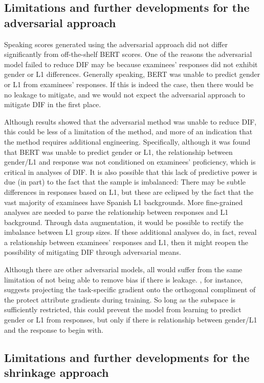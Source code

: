 \documentclass [PhD] {uclathes}
\begin{document}
\subsection{Limitations and further developments for the adversarial approach}

Speaking scores generated using the adversarial approach did not differ significantly from off-the-shelf BERT scores. One of the reasons the adversarial model failed to reduce DIF may be because examinees’ responses did not exhibit gender or L1 differences. Generally speaking, BERT was unable to predict gender or L1 from examinees’ responses. If this is indeed the case, then there would be no leakage to mitigate, and we would not expect the adversarial approach to mitigate DIF in the first place. 

Although results showed that the adversarial method was unable to reduce DIF, this could be less of a limitation of the method, and more of an indication that the method requires additional engineering. Specifically, although it was found that BERT was unable to predict gender or L1, the relationship between gender/L1 and response was not conditioned on examinees’ proficiency, which is critical in analyses of DIF. It is also possible that this lack of predictive power is due (in part) to the fact that the sample is imbalanced: There may be subtle differences in responses based on L1, but these are eclipsed by the fact that the vast majority of examinees have Spanish L1 backgrounds. More fine-grained analyses are needed to parse the relationship between responses and L1 background. Through data augmentation, it would be possible to rectify the imbalance between L1 group sizes. If these additional analyses do, in fact, reveal a relationship between examinees’ responses and L1, then it might reopen the possibility of mitigating DIF through adversarial means. 

Although there are other adversarial models, all would suffer from the same limitation of not being able to remove bias if there is leakage. \citet{zhang2018mitigating}, for instance, suggests projecting the task-specific gradient onto the orthogonal compliment of the protect attribute gradients during training. So long as the subspace is sufficiently restricted, this could prevent the model from learning to predict gender or L1 from responses, but only if there is relationship between gender/L1 and the response to begin with. 

\subsection{Limitations and further developments for the shrinkage approach}
\end{document}
